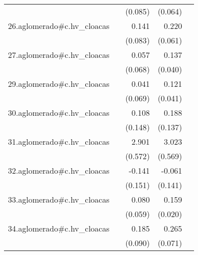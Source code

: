 {\begin{longtable}{l*{4}{D{.}{.}{-1}}}
            &                     &     (0.085)         &     (0.064)         &                     \\
\addlinespace
26.aglomerado#c.hv\_cloacas&                     &       0.141         &       0.220\sym{***}&                     \\
            &                     &     (0.083)         &     (0.061)         &                     \\
\addlinespace
27.aglomerado#c.hv\_cloacas&                     &       0.057         &       0.137\sym{***}&                     \\
            &                     &     (0.068)         &     (0.040)         &                     \\
\addlinespace
29.aglomerado#c.hv\_cloacas&                     &       0.041         &       0.121\sym{**} &                     \\
            &                     &     (0.069)         &     (0.041)         &                     \\
\addlinespace
30.aglomerado#c.hv\_cloacas&                     &       0.108         &       0.188         &                     \\
            &                     &     (0.148)         &     (0.137)         &                     \\
\addlinespace
31.aglomerado#c.hv\_cloacas&                     &       2.901\sym{***}&       3.023\sym{***}&                     \\
            &                     &     (0.572)         &     (0.569)         &                     \\
\addlinespace
32.aglomerado#c.hv\_cloacas&                     &      -0.141         &      -0.061         &                     \\
            &                     &     (0.151)         &     (0.141)         &                     \\
\addlinespace
33.aglomerado#c.hv\_cloacas&                     &       0.080         &       0.159\sym{***}&                     \\
            &                     &     (0.059)         &     (0.020)         &                     \\
\addlinespace
34.aglomerado#c.hv\_cloacas&                     &       0.185\sym{*}  &       0.265\sym{***}&                     \\
            &                     &     (0.090)         &     (0.071)         &                     \\

\end{longtable}}
